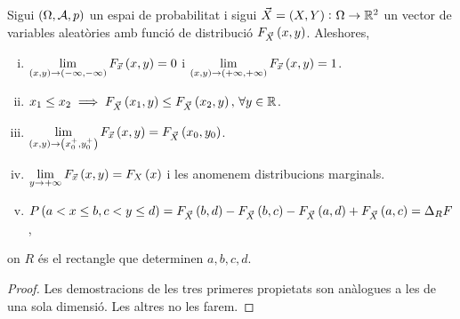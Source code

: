 \begin{prop}
    Sigui $\left(\Omega,\mathcal{A},p\right)$ un espai de probabilitat i sigui $\vec{X}=\left( X,Y\right)\colon\Omega\to\mathbb{R}^2$ un vector de variables aleatòries amb funció de distribució $F_{\vec{X}}\left( x,y\right)$. Aleshores,
    \begin{enumerate}[i)]
        \item $\lim\limits_{\left( x,y \right)\to\left(-\infty,-\infty\right)}F_{\vec{x}}\left( x, y\right)=0$ i $\lim\limits_{\left( x,y \right)\to\left(+\infty,+\infty\right)}F_{\vec{x}}\left( x, y\right)=1$.
        \item $x_1\leq x_2\implies F_{\vec{X}}\left( x_1,y\right)\leq F_{\vec{X}}\left( x_2,y\right),\,\forall y\in\mathbb{R}$.
        \item $\lim\limits_{\left( x,y \right)\to\left( x_0^+,y_0^+\right)}F_{\vec{x}}\left( x, y\right)=F_{\vec{X}}\left( x_0,y_0\right)$.
        \item $\lim\limits_{y\to+\infty}F_{\vec{x}}\left( x, y\right)=F_X\left( x\right)$ i les anomenem distribucions marginals.
        \item $P\left( a<x\leq b, c<y\leq d\right)=F_{\vec{X}}\left( b,d\right)-F_{\vec{X}}\left( b,c\right)-F_{\vec{X}}\left( a,d\right)+F_{\vec{X}}\left( a,c\right)=\Delta_RF$,
    \end{enumerate}
    on $R$ és el rectangle que determinen $a, b, c, d$.
\end{prop}
\begin{proof}
    Les demostracions de les tres primeres propietats son anàlogues a les de una sola dimensió. Les altres no les farem.
\end{proof}

